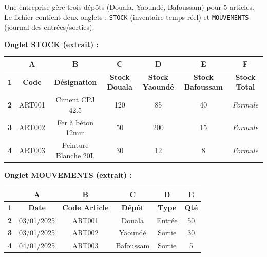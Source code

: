 \documentclass[11pt]{article}
\begin{document}
\begin{exercice}
Une entreprise gère trois dépôts (Douala, Yaoundé, Bafoussam) pour 5 articles. Le fichier contient deux onglets : \texttt{STOCK} (inventaire temps réel) et \texttt{MOUVEMENTS} (journal des entrées/sorties).

\textbf{Onglet STOCK (extrait) :}
\begin{tabular}{|c|c|c|c|c|c|c|}
\hline
& \textbf{A} & \textbf{B} & \textbf{C} & \textbf{D} & \textbf{E} & \textbf{F} \\
\hline
\textbf{1} & \textbf{Code} & \textbf{Désignation} & \textbf{Stock Douala} & \textbf{Stock Yaoundé} & \textbf{Stock Bafoussam} & \textbf{Stock Total} \\
\hline
\textbf{2} & ART001 & Ciment CPJ 42.5 & 120 & 85 & 40 & \textit{Formule} \\
\textbf{3} & ART002 & Fer à béton 12mm & 50 & 200 & 15 & \textit{Formule} \\
\textbf{4} & ART003 & Peinture Blanche 20L & 30 & 12 & 8 & \textit{Formule} \\
\hline
\end{tabular}

\textbf{Onglet MOUVEMENTS (extrait) :}
\begin{tabular}{|c|c|c|c|c|c|}
\hline
& \textbf{A} & \textbf{B} & \textbf{C} & \textbf{D} & \textbf{E} \\
\hline
\textbf{1} & \textbf{Date} & \textbf{Code Article} & \textbf{Dépôt} & \textbf{Type} & \textbf{Qté} \\
\hline
\textbf{2} & 03/01/2025 & ART001 & Douala & Entrée & 50 \\
\textbf{3} & 03/01/2025 & ART002 & Yaoundé & Sortie & 30 \\
\textbf{4} & 04/01/2025 & ART003 & Bafoussam & Sortie & 5 \\
\hline
\end{tabular}


\end{exercice}
\end{document}
